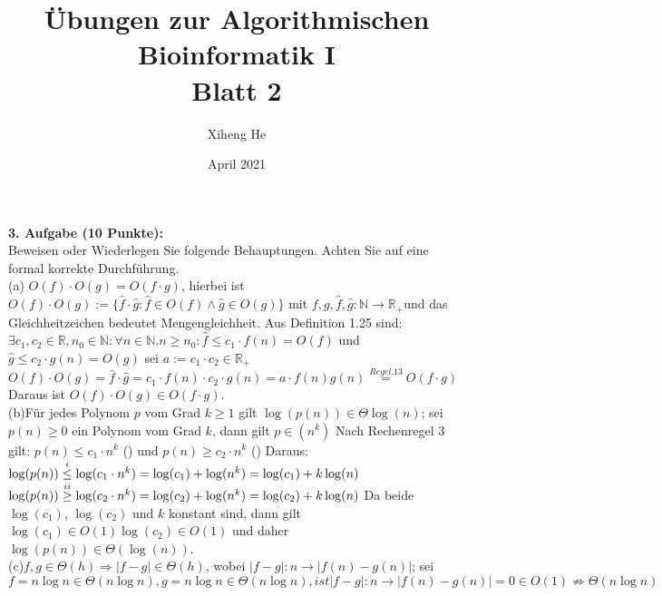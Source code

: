 \documentclass{article}
\title{Übungen zur Algorithmischen Bioinformatik I\\
Blatt 2}
\author{Xiheng He }
\date{April 2021}
\begin{document}
\maketitle
\begin{flushleft}
\textbf{3. Aufgabe (10 Punkte):}\\
Beweisen oder Wiederlegen Sie folgende Behauptungen. Achten Sie auf eine formal korrekte Durchführung.
\newline\\
(a) $O(f) \cdot O(g) = O(f \cdot g)$, hierbei ist $O(f) \cdot O(g) := \{\hat{f} \cdot \hat{g}: \hat{f} \in O(f) \land \hat{g} \in O(g)\}$
mit $f,g,\hat{f},\hat{g}: \mathbb{N} \longrightarrow \mathbb{R_+}$und das Gleichheitzeichen bedeutet Mengengleichheit.
\newline
Aus Definition 1.25 sind:
\newline
$\exists c_1, c_2 \in \mathbb{R}, n_0 \in \mathbb{N}: \forall n \in \mathbb{N}. n \geq n_0: \hat{f} \leq c_1 \cdot f(n) = O(f)$ und $\hat{g} \leq c_2 \cdot g(n) = O(g)$
\newline
sei $a := c_1 \cdot c_2 \in \mathbb{R_+}$ 
\newline
$O(f) \cdot O(g) = \hat{f} \cdot \hat{g} = c_1 \cdot f(n) \cdot c_2 \cdot g(n) = a \cdot f(n)g(n) \overset{Regel.13}{=} O(f \cdot g)$
\newline
Daraus ist $O(f) \cdot O(g) \in O(f \cdot g)$.
\newline\\
(b)Für jedes Polynom $p$ vom Grad $k \geq 1$ gilt $\log (p(n)) \in \Theta \log(n)$;
\newline
sei $p(n) \geq 0$ ein Polynom vom Grad $k$, dann gilt $p \in (n^k)$
\newline
Nach Rechenregel 3 gilt: $p(n) \leq c_1 \cdot n^k $ () und $p(n) \geq c_2 \cdot n^k$ ()
\newline
Daraus:
\newline 
$ \log(p(n)) \overset{\romannumeral1}{\leq} \log(c_1 \cdot n^k) = \log(c_1) + \log(n^k) = \log(c_1) + k\log(n)$
\newline
$ \log(p(n)) \overset{\romannumeral2}{\geq} \log(c_2 \cdot n^k) = \log(c_2) + \log(n^k) = \log(c_2) + k\log(n)$
\newline
Da beide $\log(c_1)$, $\log(c_2)$ und $k$ konstant sind, dann gilt $\log(c_1) \in O(1) \log(c_2) \in O(1)$ und daher $\log(p(n)) \in \Theta(\log(n))$.
\newline\\
(c)$f,g \in \Theta(h) \Rightarrow |f - g| \in \Theta(h)$, wobei $|f - g| : n \rightarrow |f(n) - g(n)|$;
\newline 
sei $ f = n\log n \in \Theta(n\log n), g = n\log n \in \Theta(n\log n), ist |f -g| : n \rightarrow |f(n) - g(n)| = 0 \in O(1) \not\Longrightarrow \Theta(n\log n)$ 
\end{flushleft}
\end{document}
